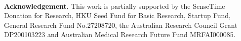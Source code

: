 \documentclass[runningheads]{llncs}
\begin{document}
	~\\
	\textbf{Acknowledgement.} This work is partially supported by the SenseTime Donation for Research, HKU Seed Fund for Basic Research, Startup Fund, General Research Fund No.27208720, the Australian Research Council Grant DP200103223 and Australian Medical Research Future Fund MRFAI000085.
	

	
\end{document}
